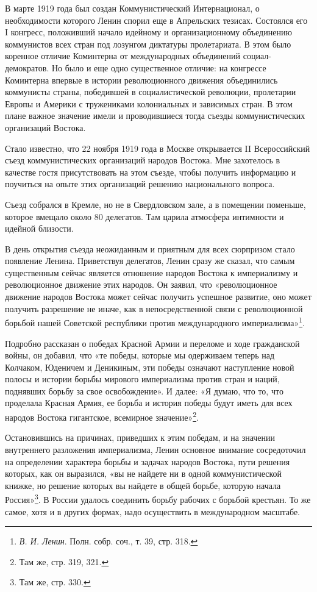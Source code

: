 \documentclass[12pt, a4paper, openany]{book}
\begin{document}
В марте 1919 года был создан Коммунистический Интернационал, о необходимости которого Ленин спорил еще в Апрельских тезисах. Состоялся его I конгресс, положивший начало идейному и организационному объединению коммунистов всех стран под лозунгом диктатуры пролетариата. В этом было коренное отличие Коминтерна от международных объединений социал-демократов. Но было и еще одно существенное отличие: на конгрессе Коминтерна впервые в истории революционного движения объединились коммунисты страны, победившей в социалистической революции, пролетарии Европы и Америки с тружениками колониальных и зависимых стран. В этом плане важное значение имели и проводившиеся тогда съезды коммунистических организаций Востока.

Стало известно, что 22 ноября 1919 года в Москве открывается II Всероссийский съезд коммунистических организаций народов Востока. Мне захотелось в качестве гостя присутствовать на этом съезде, чтобы получить информацию и поучиться на опыте этих организаций решению национального вопроса.

Съезд собрался в Кремле, но не в Свердловском зале, а в помещении поменьше, которое вмещало около 80 делегатов. Там царила атмосфера интимности и идейной близости.

В день открытия съезда неожиданным и приятным для всех сюрпризом стало появление Ленина. Приветствуя делегатов, Ленин сразу же сказал, что самым существенным сейчас является отношение народов Востока к империализму и революционное движение этих народов. Он заявил, что «революционное движение народов Востока может сейчас получить успешное развитие, оно может получить разрешение не иначе, как в непосредственной связи с революционной борьбой нашей Советской республики против международного империализма»\footnote{\textit{В. И. Ленин}. Полн. собр. соч., т. 39, стр. 318.}.

Подробно рассказан о победах Красной Армии и переломе и ходе гражданской войны, он добавил, что «те победы, которые мы одерживаем теперь над Колчаком, Юденичем и Деникиным, эти победы означают наступление новой полосы и истории борьбы мирового империализма против стран и наций, поднявших борьбу за свое освобождение». И далее: «Я думаю, что то, что проделала Красная Армия, ее борьба и история победы будут иметь для всех народов Востока гигантское, всемирное значение»\footnote{Там же, стр. 319, 321.}.

Остановившись на причинах, приведших к этим победам, и на значении внутреннего разложения империализма, Ленин основное внимание сосредоточил на определении характера борьбы и задачах народов Востока, пути решения которых, как он выразился, «вы не найдете ни в одной коммунистической книжке, но решение которых вы найдете в общей борьбе, которую начала Россия»\footnote{Там же, стр. 330.}. В России удалось соединить борьбу рабочих с борьбой крестьян. То же самое, хотя и в других формах, надо осуществить в международном масштабе.
\end{document}
